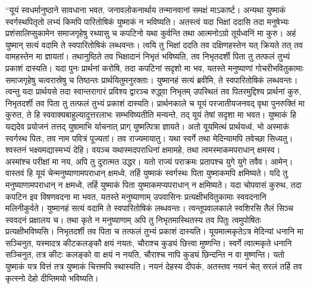 \adhyAya
{}
\vakya “यूयं स्वधर्मानुष्ठाने सावधाना भवत, जनावलोकनार्थाय तन्मानवानां समक्षं माऽकार्ष्ट। अन्यथा युष्माकं स्वर्गस्थपितृतो लभ्यं किमपि पारितोषिकं युष्माकं न भविष्यति।
\vakya अतस्त्वं यदा भिक्षां ददासि तदा मनुषेभ्यः प्रशंसालिप्सुकामेन समाजगृहेषु रथ्यासु च कपटिनो यथा कुर्वन्ति तथा आत्मनोऽग्रो तूर्यध्वनिं मा कुरु।
\vakya अहं युष्मान् सत्यं वदामि ते स्वपारितोषिकं लब्धवन्तः। त्वयि तु भिक्षां ददति तव दक्षिणहस्तेन यत् क्रियते तत् तव वामहस्तेन मा ज्ञायतां।
\vakya तथानुष्ठिते तव भिक्षादानं निभृतं भविष्यति, तव निभृतदर्शी पिता तु तत्फलं तुभ्यं प्रकाशं दास्यति।
\vakya यदा पुनः प्रार्थनां करोषि, तदा कपटिनां सदृशो मा भव, यतस्ते मनुष्याणां गोचरीभवितुकामाः समाजगृहेषु चत्वरास्रेषु च तिष्ठन्तः प्रार्थयितुमनुरक्ताः। युष्मानहं सत्यं ब्रवीमि, ते स्वपारितोषिकं लब्धवन्तः।
\vakya त्वन्तु यदा प्रार्थयसे तदा स्वान्तरागारं प्रविश्य द्वारञ्च रुद्ध्वा निभृतम् उपस्थितं तव पितरमुद्दिश्य प्रार्थनां कुरु, निभृतदर्शी तव पिता तु तत्फलं तुभ्यं प्रकाशं दास्यति।
\vakya प्रार्थनकाले च यूयं परजातीयजनवद् वृथा पुनरुक्तिं मा कुरुत, ते हि स्ववाक्यबाहुल्यादुत्तरलाभः सम्भविष्यतीति मन्यन्ते, तद् यूयं तेषां सदृशा मा भवत।
\vakya युष्माकं हि यद्यदेव प्रयोजनं तत्तद् युषामाभि र्याचनात् प्राग् युष्मत्पित्रा ज्ञायते।
\vakya अतो यूयमित्थं प्रार्थयध्वं, भो अस्माकं स्वर्गस्थ पितः, तव नाम पवित्रं पूज्यतां।
\vakya तव राज्यमायातु। यथा स्वर्गे तथा मेदिन्यामपि तवेच्छा सिध्यतु।
\vakya श्वस्तनं भक्ष्यमद्यास्मभ्यं देहि।
\vakya वयञ्च यथास्मदपराधिनां क्षमामहे, तथा त्वमस्माकमपराधान् क्षमस्व।
\vakya अस्मांश्च परीक्षां मा नय, अपि तु दुरात्मत उद्धर। यतो राज्यं पराक्रमः प्रतापश्च युगे युगे तवैव। आमेन्।
\vakya वास्तवं हि यूयं चेन्मनुष्याणामपराधान् क्षमध्वे, तर्हि युष्माकं स्वर्गस्थः पिता युष्माकमपि क्षमिष्यते।
\vakya यदि तु मनुष्याणामपराधान् न क्षमध्वे, तर्हि युष्माकं पिता युष्माकमप्यपराधान् न क्षमिष्यते।
\vakya यदा चोपवासं कुरुथ, तदा कपटिन इव विषणवदना मा भवत, यतस्ते मनुष्याणाम् उपवासिनः प्रत्यक्षीभवितुकामाः स्ववदनानि मलिनीकुर्वते। युष्मानहं सत्यं वदामि ते स्वपारितोषिकं लब्धवन्तः।
\vakya त्वन्तूपवालकाले स्वशिरसि तैलं सिञ्च स्ववदनं प्रक्षालय च।
\vakya तथा कृते न मनुष्याणाम् अपि तु निभृतमास्थितस्य तव पितुः त्वमुपोषितः प्रत्यक्षीभविष्यसि। निभृतदर्शी तव पिता च तत्फलं तुभ्यं प्रकाशं दास्यति।
\vakya यूयमात्मकृतेऽत्र मेदिन्यां धनानि मा सञ्चिनुत, यस्मादत्र कीटकलङ्कौ क्षयं नयतः, चौराश्च कुड्यं छित्त्वा मुष्णन्ति।
\vakya स्वर्गे त्वात्मकृते धनानि सञ्चिनुत, तत्र कीटः कलङ्को वा क्षयं न नयति, चौराश्च नापि कुड्यं छिन्दन्ति न वा मुष्णन्ति।
\vakya यतो युष्माकं यत्र वित्तं तत्र युष्माकं चित्तमपि स्थास्यति।
\vakya नयनं देहस्य दीपकं, अतस्तव नयनं चेत् सरलं तर्हि तव कृत्स्नो देहो दीप्तिमयो भविष्यति।
